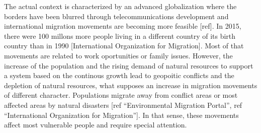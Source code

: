 
The actual context is characterized by an advanced globalization where the borders have been blurred through telecommunications development and international migration movements are becoming more feasible [ref]. In 2015, there were 100 millons more people living in a different country of its birth country than in 1990 [International Organization for Migration]. Most of that movements are related to work oportunities or family issues. However, the increase of the population and the rising demand of natural resources to support a system based on the continous growth lead to geopoitic conflicts and the depletion of natural resources, what supposes an increase in migration movements of different character. Populations migrate away from conflict areas or most affected areas by natural disasters [ref ``Environmental Migration Portal'', ref ``International Organization for Migration'']. In that sense, these movements affect most vulnerable people and require special attention.


